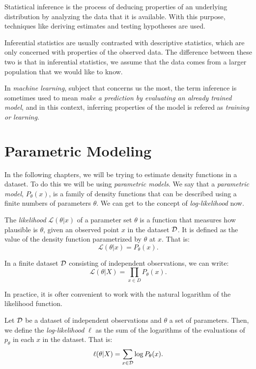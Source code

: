 Statistical inference is the process of deducing properties of an underlying distribution by analyzing the data that it is available. With this purpose, techniques like deriving estimates and testing hypotheses are used. 

Inferential statistics are usually contrasted with descriptive statistics, which are only concerned with properties of the observed data. The difference between these two is that in inferential statistics, we assume that the data comes from a larger
population that we would like to know.

In \emph{machine learning}, subject that concerns us the most, the term inference is sometimes used to mean \emph{make a prediction by evaluating an already trained model}, and in this context, inferring properties of the model is refered as \emph{training or learning}.

\section{Parametric Modeling}

In the following chapters, we will be trying to estimate density functions in a dataset. To do this we will be using \emph{parametric models}. We say that a \emph{parametric model}, $P_\theta(x)$, 
is a family of density functions that can be described using a finite numbers of parameters $\theta$. We can get to the concept of \emph{log-likelihood} now.

\begin{ndef}
The \emph{likelihood} $\mathcal L(\theta | x)$ of a parameter set $\theta$ is a function that measures how plausible is $\theta$, given an observed point $x$ in the dataset $\mathcal{D}$. It is defined as the value of the 
density function parametrized by $\theta$ at $x$. That is:
$$
\mathcal L(\theta|x) = P_\theta(x).
$$
\end{ndef}

In a finite dataset $\mathcal{D}$ consisting of independent observations, we can write:
\[
\mathcal L(\theta | X) = \prod_{x \in D} P_\theta(x).
\]

In practice, it is ofter convenient to work with the natural logarithm of the likelihood function. 

\begin{ndef}
Let $\mathcal{D}$ be a dataset of independent observations and $\theta$ a set of parameters. Then, we define the \emph{log-likelihood} $\ell$ as the sum of the logarithms of the evaluations of $p_\theta$ in each $x$ in the dataset. That is:
\[
\ell (\theta | X) = \sum_{x \in \mathcal{D}} \log P_\theta(x).
\]
\end{ndef}

